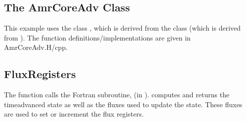 \documentclass[letterpaper,10pt,english]{sphinxmanual}
\begin{document}
\subsection{The AmrCoreAdv Class}
\label{\detokenize{AmrCore:the-amrcoreadv-class}}
\sphinxAtStartPar
This example uses the class , which is derived from the class 
(which is derived from ). The function definitions/implementations
are given in AmrCoreAdv.H/cpp.


\subsection{FluxRegisters}
\label{\detokenize{AmrCore:fluxregisters}}
\sphinxAtStartPar
The function  calls the Fortran
subroutine,  (in ).  computes
and returns the time\sphinxhyphen{}advanced state as well as the fluxes used to update the state.
These fluxes are used to set or increment the flux registers.
\end{document}
